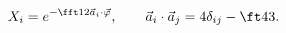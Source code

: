 \begin{equation}
X_i=e^{-\fft12\vec a_i\cdot\vec\varphi},\qquad
\vec a_i\cdot\vec a_j=4\delta_{ij}-\ft43.
\end{equation}

